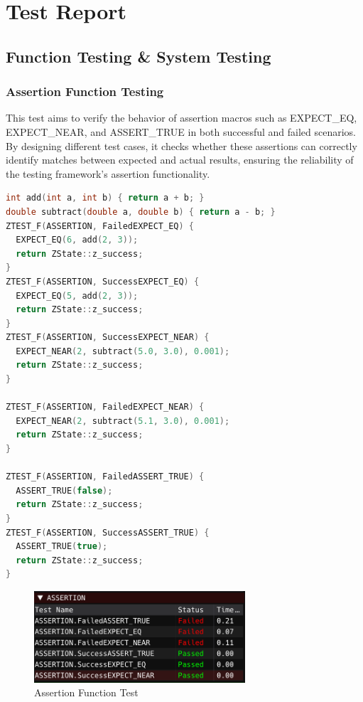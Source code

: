\documentclass{article}
\begin{document}
\section{Test Report}
\subsection{Function Testing \& System Testing}
\subsubsection{Assertion Function Testing}
This test aims to verify the behavior of assertion macros such as EXPECT\_EQ, EXPECT\_NEAR, and ASSERT\_TRUE in both successful and failed scenarios. By designing different test cases, it checks whether these assertions can correctly identify matches between expected and actual results, ensuring the reliability of the testing framework's assertion functionality.
\begin{framed}
    \begin{lstlisting}[language=C++]
int add(int a, int b) { return a + b; }
double subtract(double a, double b) { return a - b; }
ZTEST_F(ASSERTION, FailedEXPECT_EQ) {
  EXPECT_EQ(6, add(2, 3));
  return ZState::z_success;
}
ZTEST_F(ASSERTION, SuccessEXPECT_EQ) {
  EXPECT_EQ(5, add(2, 3));
  return ZState::z_success;
}
ZTEST_F(ASSERTION, SuccessEXPECT_NEAR) {
  EXPECT_NEAR(2, subtract(5.0, 3.0), 0.001);
  return ZState::z_success;
}

ZTEST_F(ASSERTION, FailedEXPECT_NEAR) {
  EXPECT_NEAR(2, subtract(5.1, 3.0), 0.001);
  return ZState::z_success;
}

ZTEST_F(ASSERTION, FailedASSERT_TRUE) {
  ASSERT_TRUE(false);
  return ZState::z_success;
}
ZTEST_F(ASSERTION, SuccessASSERT_TRUE) {
  ASSERT_TRUE(true);
  return ZState::z_success;
}
\end{lstlisting}
\end{framed}
\begin{figure}[H]
    \centering
    \includegraphics[width=0.7\textwidth]{img/ass.png} %
    \caption{Assertion Function Test}
    \label{fig:assertion function test}
\end{figure}
\end{document}
